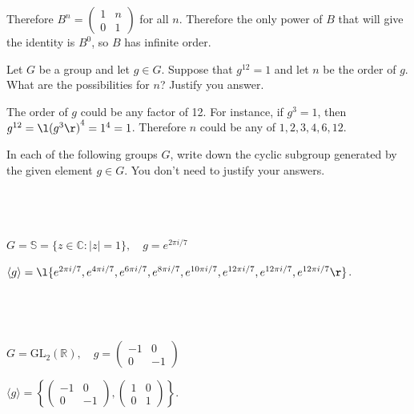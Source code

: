 \documentclass[a4paper]{article}
\begin{document}
Therefore $B^n = \begin{pmatrix} 1 & n \\ 0 & 1 \end{pmatrix}$ for all $n$. Therefore the only power of $B$ that will give the identity is $B^0$, so $B$ has infinite order.


\begin{questionbody}
Let $G$ be a group and let $g \in G$. Suppose that $g^{12} = 1$ and let $n$ be the order of $g$. What are the possibilities for $n$? Justify you answer.
\end{questionbody}

The order of $g$ could be any factor of 12. For instance, if $g^3 = 1$, then $g^{12} = {\l(g^3\r)}^4 = 1^4 = 1$. Therefore $n$ could be any of $1, 2, 3, 4, 6, 12$.


\begin{questionbody}
In each of the following groups $G$, write down the cyclic subgroup generated by the given element $g \in G$. You don't need to justify your answers.
\end{questionbody}

\subsection{~} %

\begin{questionbody}
$G = \mathbb S = \{z \in \mathbb C : |z| = 1\}, \quad g = e^{2 \pi i / 7}$
\end{questionbody}

$\langle g \rangle = \l\{ e^{2 \pi i / 7}, e^{4 \pi i / 7}, e^{6 \pi i / 7}, e^{8 \pi i / 7}, e^{10 \pi i / 7}, e^{12 \pi i / 7}, e^{12 \pi i / 7}, e^{12 \pi i / 7} \r\}$.

\subsection{~} %

\begin{questionbody}
$G = \text{GL}_2(\mathbb R), \quad g = \begin{pmatrix} -1 & 0 \\ 0 & -1 \end{pmatrix}$
\end{questionbody}

$\langle g \rangle = \left\{ \begin{pmatrix}-1 & 0 \\ 0 & -1\end{pmatrix}, \begin{pmatrix}1 & 0 \\ 0 & 1\end{pmatrix} \right\}$.
\end{document}
